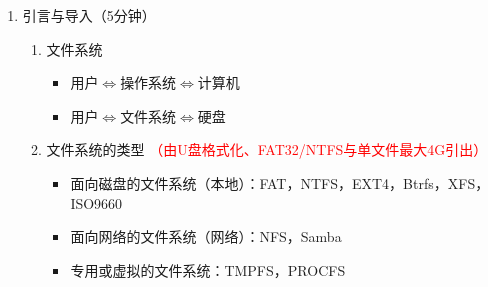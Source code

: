 \documentclass{TIJMUjiaoanLL}
\begin{document}

\firstTail


\newpage
\otherHeader

\begin{enumerate}
  \item 引言与导入（5分钟）
    \begin{enumerate}
      \item 文件系统
	\begin{itemize}
	  \item 用户$\Leftrightarrow$操作系统$\Leftrightarrow$计算机
	  \item 用户$\Leftrightarrow$文件系统$\Leftrightarrow$硬盘
	\end{itemize}
      \item 文件系统的类型 \textcolor{red}{（由U盘格式化、FAT32/NTFS与单文件最大4G引出）}
	\begin{itemize}
	  \item 面向磁盘的文件系统（本地）：FAT，NTFS，EXT4，Btrfs，XFS，ISO9660
	  \item 面向网络的文件系统（网络）：NFS，Samba
	  \item 专用或虚拟的文件系统：TMPFS，PROCFS
	\end{itemize}
    \end{enumerate}



\end{enumerate}
\end{document}
